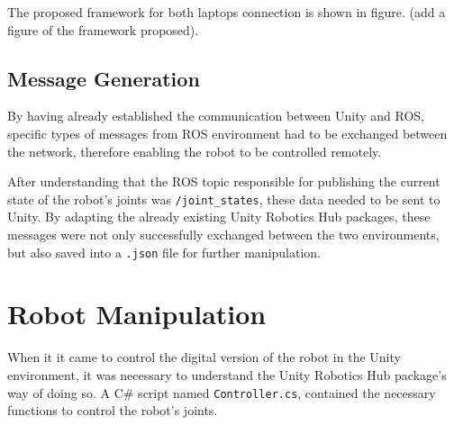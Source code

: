 The proposed framework for both laptops connection is shown in figure. (add a figure of the framework proposed).




\subsection{Message Generation}

By having already established the communication between Unity and ROS, specific types of messages from ROS environment had to be exchanged between the network, therefore enabling the robot to be controlled remotely.

After understanding that the ROS topic responsible for publishing the current state of the robot's joints was \texttt{/joint\_states}, these data needed to be sent to Unity. By adapting the already existing Unity Robotics Hub packages, these messages were not only successfully exchanged between the two environments, but also saved into a \texttt{.json} file for further manipulation.

\section{Robot Manipulation}
When it it came to control the digital version of the robot in the Unity environment, it was necessary to understand the Unity Robotics Hub package's way of doing so. A C\# script named \texttt{Controller.cs}, contained the necessary functions to control the robot's joints.


